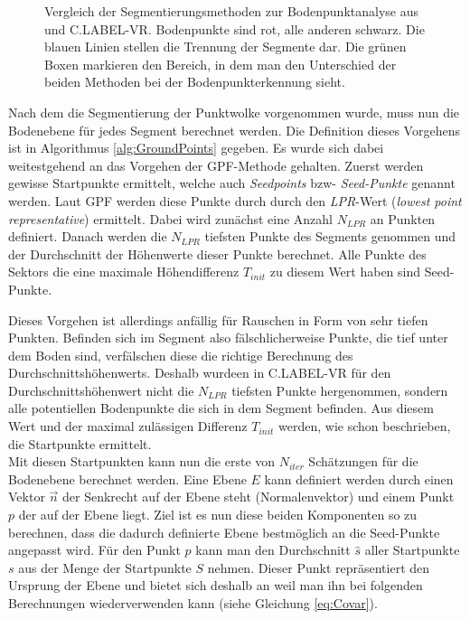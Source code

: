 \begin{figure}%
    \centering
    \qquad
    \caption{Vergleich der Segmentierungsmethoden zur Bodenpunktanalyse aus \cite{bib:Segmentation1} und C.LABEL-VR. Bodenpunkte sind rot, alle anderen schwarz. Die blauen Linien stellen die Trennung der Segmente dar. Die grünen Boxen markieren den Bereich, in dem man den Unterschied der beiden Methoden bei der Bodenpunkterkennung sieht.}\label{fig:Segmentation}%
\end{figure}

Nach dem die Segmentierung der Punktwolke vorgenommen wurde, muss nun die Bodenebene für jedes Segment berechnet werden. Die Definition dieses Vorgehens ist in Algorithmus \ref{alg:GroundPoints} gegeben. Es wurde sich dabei weitestgehend an das Vorgehen der GPF-Methode gehalten. Zuerst werden gewisse Startpunkte ermittelt, welche auch \textit{Seedpoints} bzw- \textit{Seed-Punkte} genannt werden. Laut GPF werden diese Punkte durch durch den \textit{LPR}-Wert (\textit{lowest point representative}) ermittelt. Dabei wird zunächst eine Anzahl $N_{LPR}$ an Punkten definiert. Danach werden die $N_{LPR}$ tiefsten Punkte des Segments genommen und der Durchschnitt der Höhenwerte dieser Punkte berechnet. Alle Punkte des Sektors die eine maximale Höhendifferenz $T_{init}$ zu diesem Wert haben sind Seed-Punkte. 

Dieses Vorgehen ist allerdings anfällig für Rauschen in Form von sehr tiefen Punkten. Befinden sich im Segment also fälschlicherweise Punkte, die tief unter dem Boden sind, verfälschen diese die richtige Berechnung des Durchschnittshöhenwerts. Deshalb wurdeen in C.LABEL-VR für den Durchschnittshöhenwert nicht die $N_{LPR}$ tiefsten Punkte hergenommen, sondern alle potentiellen Bodenpunkte die sich in dem Segment befinden. Aus diesem Wert und der maximal zulässigen Differenz $T_{init}$ werden, wie schon beschrieben, die Startpunkte ermittelt.\\

Mit diesen Startpunkten kann nun die erste von $N_{iter}$ Schätzungen für die Bodenebene berechnet werden. Eine Ebene $E$ kann definiert werden durch einen Vektor $\vec{n}$ der Senkrecht auf der Ebene steht (Normalenvektor) und einem Punkt $p$ der auf der Ebene liegt. Ziel ist es nun diese beiden Komponenten so zu berechnen, dass die dadurch definierte Ebene bestmöglich an die Seed-Punkte angepasst wird. Für den Punkt $p$ kann man den Durchschnitt $\hat{s}$ aller Startpunkte $s$ aus der Menge der Startpunkte $S$ nehmen. Dieser Punkt repräsentiert den Ursprung der Ebene und bietet sich deshalb an weil man ihn bei folgenden Berechnungen wiederverwenden kann (siehe Gleichung \ref{eq:Covar}).\\

